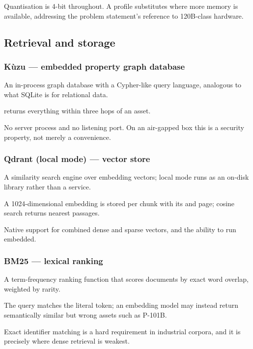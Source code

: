 \noindent Quantisation is 4-bit throughout. A  profile
substitutes  where more memory is available, addressing the
problem statement's reference to 120B-class hardware.

\subsection{Retrieval and storage}

\subsubsection{K\`uzu --- embedded property graph database}
\begin{description}[leftmargin=0pt,style=nextline]
\item[Definition.] An in-process graph database with a Cypher-like query
language, analogous to what SQLite is for relational data.
\item[Example.] 
returns everything within three hops of an asset.
\item[Why chosen.] No server process and no listening port. On an air-gapped
box this is a security property, not merely a convenience.
\end{description}

\subsubsection{Qdrant (local mode) --- vector store}
\begin{description}[leftmargin=0pt,style=nextline]
\item[Definition.] A similarity search engine over embedding vectors; local
mode runs as an on-disk library rather than a service.
\item[Example.] A 1024-dimensional  embedding is stored per chunk
with its  and page; cosine search returns nearest passages.
\item[Why chosen.] Native support for combined dense and sparse vectors, and
the ability to run embedded.
\end{description}

\subsubsection{BM25 --- lexical ranking}
\begin{description}[leftmargin=0pt,style=nextline]
\item[Definition.] A term-frequency ranking function that scores documents by
exact word overlap, weighted by rarity.
\item[Example.] The query  matches the literal token; an embedding
model may instead return semantically similar but wrong assets such as P-101B.
\item[Why chosen.] Exact identifier matching is a hard requirement in
industrial corpora, and it is precisely where dense retrieval is weakest.
\end{description}

